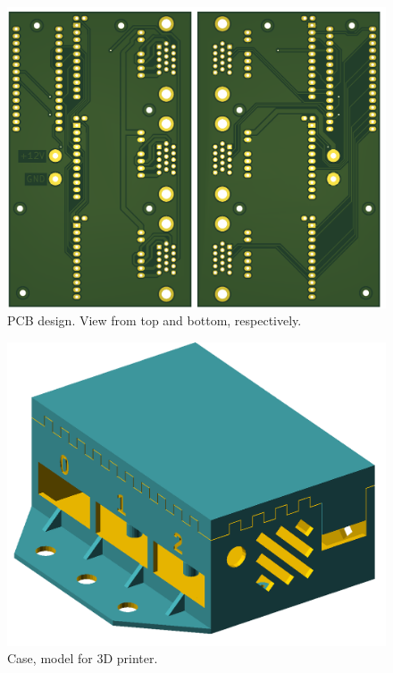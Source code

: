 \documentclass[10pt,article]{article}
\begin{document}
\begin{figure}[h]
 \centering
 \includegraphics[width = 14cm]{render.png}
\caption {PCB design. View from top and bottom, respectively.} \label{pcb}
\end{figure}

\begin{figure}[h]
 \centering
 \includegraphics[width = 15cm]{case.png}
\caption {Case, model for 3D printer.} \label{case}
\end{figure}




\end{document}
